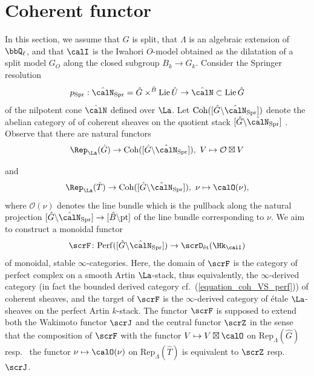 \documentclass[10pt, reqno]{amsart}
\theoremstyle{plain}
\theoremstyle{definition}
\numberwithin{equation}{section}
\begin{document}
	\section{Coherent functor}
	In this section, we assume that $G$ is split, that $\Lambda$ is an algebraic extension of $\bbQ_\ell$, and that $\calI$ is the Iwahori $O$-model obtained as the dilatation of a split model $G_O$ along the closed subgroup $B_k \to G_k$. Consider the Springer resolution \begin{equation}\label{Springer_resolution}
		p_\mathrm{Spr}:\hat{\calN}_{\mathrm{Spr}}=\hat{G} \times^{\hat{B}} \mathrm{Lie}\,\hat{U}\rightarrow \hat{\calN} \subset \mathrm{Lie}\, \hat{G}
	\end{equation}
	of the nilpotent cone $\hat{\calN}$ defined over $\La$.
	Let $\mathrm{Coh}([\hat{G}\backslash \hat{\calN}_{\mathrm{Spr}}]) $ denote the abelian category of  of coherent sheaves on the quotient stack $[\hat{G}\backslash \hat{\calN}_{\mathrm{Spr}}]$ .  Observe that there are natural functors 
	$$  
	\Rep_\La (\hat{G}) \rightarrow  \mathrm{Coh}([\hat{G}\backslash \hat{\calN}_{\mathrm{Spr}}]),~  V\mapsto \mathcal{O}\boxtimes V
	$$    
	
	and 
	$$
	\Rep_\La (\hat{T}) \rightarrow  \mathrm{Coh}([\hat{G}\backslash \hat{\calN}_{\mathrm{Spr}}]),~ \nu\mapsto \calO(\nu),
	$$
	where $\mathcal{O}(\nu)$ denotes the line bundle which is the pullback along the natural projection $[\hat{G}\backslash \hat{\calN}_{\mathrm{Spr}}]\rightarrow [\hat{B}\backslash\mathrm{pt}]$ of the line bundle corresponding to $\nu$. We aim to construct a monoidal functor \begin{equation}
		\scrF \colon \mathrm{Perf}([\hat{G} \backslash \hat{\calN}_{\mathrm{Spr}}]) \to \scrD_{\mathrm{\acute{e}t}}(\Hk_{\calI})
	\end{equation}
	of monoidal, stable $\infty$-categories. Here, the domain of $\scrF$ is the category of perfect complex on a smooth Artin $\La$-stack, thus equivalently, the $\infty$-derived category  (in fact the bounded derived category cf.\ (\ref{equation_coh_VS_perf})) of coherent sheaves, and the target of $\scrF$ is the $\infty$-derived category of \'etale $\La$-sheaves on the perfect Artin $k$-stack. The functor $\scrF$ is supposed to extend both the Wakimoto functor $\scrJ$ and the central functor $\scrZ$ in the sense that the composition of $\scrF$ with the functor $V \mapsto V \boxtimes \calO$ on $\mathrm{Rep}_{\Lambda}(\hat{G})$ resp.~ the functor $\nu \mapsto \calO(\nu)$ on $\mathrm{Rep}_\Lambda(\hat{T})$ is equivalent to $\scrZ$ resp.~$\scrJ$.
\end{document}
